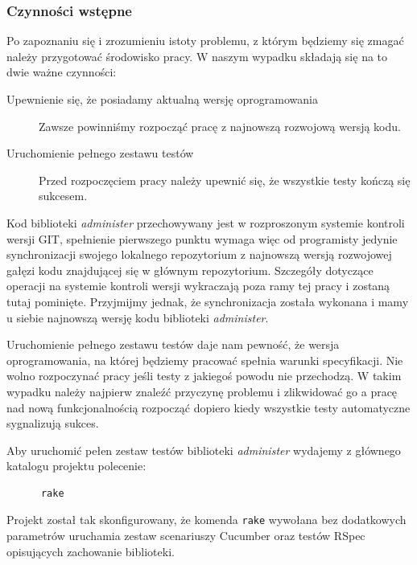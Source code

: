   	\subsubsection{Czynności wstępne}
  	
  	Po zapoznaniu się i zrozumieniu istoty problemu, z którym będziemy się zmagać należy przygotować środowisko pracy. W naszym wypadku składają się na to dwie ważne czynności:
  	
  	 \begin{description}
        \item[Upewnienie się, że posiadamy aktualną wersję oprogramowania] Zawsze powinniśmy rozpocząć pracę z najnowszą rozwojową wersją kodu.
        \item[Uruchomienie pełnego zestawu testów] Przed rozpoczęciem pracy należy upewnić się, że wszystkie testy kończą się sukcesem.
      \end{description}
      
    Kod biblioteki \emph{administer} przechowywany jest w rozproszonym systemie kontroli wersji GIT, spełnienie pierwszego punktu wymaga więc od programisty jedynie synchronizacji swojego lokalnego repozytorium z najnowszą wersją rozwojowej gałęzi kodu znajdującej się w głównym repozytorium. Szczegóły dotyczące operacji na systemie kontroli wersji wykraczają poza ramy tej pracy i zostaną tutaj pominięte. Przyjmijmy jednak, że synchronizacja została wykonana i mamy u siebie najnowszą wersję kodu biblioteki \emph{administer}. 
    
    Uruchomienie pełnego zestawu testów daje nam pewność, że wersja oprogramowania, na której będziemy pracować spełnia warunki specyfikacji. Nie wolno rozpoczynać pracy jeśli testy z jakiegoś powodu nie przechodzą. W takim wypadku należy najpierw znaleźć przyczynę problemu i zlikwidować go a pracę nad nową funkcjonalnością rozpocząć dopiero kiedy wszystkie testy automatyczne sygnalizują sukces.
    
    Aby uruchomić pełen zestaw testów biblioteki \emph{administer} wydajemy z głównego katalogu projektu polecenie:
    
    \begin{lstlisting}
      rake
    \end{lstlisting}
    
    Projekt został tak skonfigurowany, że komenda \texttt{rake} wywołana bez dodatkowych parametrów uruchamia zestaw scenariuszy Cucumber oraz testów RSpec opisujących zachowanie biblioteki. 
    
